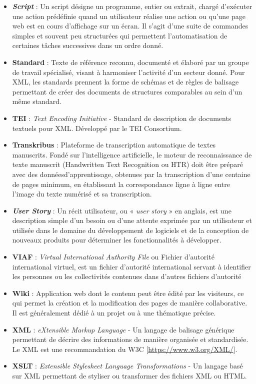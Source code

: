 \begin{itemize}
    \item \textbf{\emph{Script}} : Un script désigne un programme, entier ou extrait, chargé d'exécuter une action prédéfinie quand un utilisateur réalise une action ou qu'une page web est en cours d'affichage sur un écran. Il s'agit d'une suite de commandes simples et souvent peu structurées qui permettent l'automatisation de certaines tâches successives dans un ordre donné. 
    \item \textbf{Standard} : Texte de référence reconnu, documenté et élaboré par un groupe de travail spécialisé, visant à harmoniser l'activité d'un secteur donné. Pour XML, les standards prennent la forme de schémas et de règles de balisage permettant de créer des documents de structures comparables au sein d'un même standard.
    \item \textbf{TEI} : \emph{Text Encoding Initiative} - Standard de description de documents textuels pour XML. Développé par le TEI Consortium.
    \item{\textbf{Transkribus}} : Plateforme de transcription automatique de textes manuscrits. Fondé sur l’intelligence artificielle, le moteur de reconnaissance de texte manuscrit (Handwritten Text Recognition ou HTR) doit être préparé avec des donnéesd’apprentissage, obtenues par la transcription d’une centaine de pages minimum, en établissant la correspondance ligne à ligne entre l’image du texte numérisé et sa transcription.
    \item{\emph{\textit{\textbf{User Story}}}} : Un récit utilisateur, ou «\textit{ user story} »  en anglais, est une description simple d’un besoin ou d’une attente exprimée par un utilisateur et utilisée dans le domaine du développement de logiciels et de la conception de nouveaux produits pour déterminer les fonctionnalités à développer.
    \item \textbf{VIAF} : \emph{Virtual International Authority File} ou Fichier d'autorité international virtuel, est un fichier d'autorité international servant à identifier les personnes ou les collectivités contenues dans d'autres fichiers d'autorité
    \item \textbf{Wiki} : Application web dont le contenu peut être édité par les visiteurs, ce qui permet la création et la modification des pages de manière collaborative. Il est généralement dédié à un projet ou à une thématique précise.
    \item \textbf{XML} : \emph{eXtensible Markup Language} -  Un langage de balisage générique permettant de décrire des informations de manière organisée et standardisée. Le XML est une recommandation du W3C [\url{https://www.w3.org/XML/}].
    \item \textbf{XSLT} : \emph{Extensible Stylesheet Language Transformations} - Un langage basé sur XML permettant de styliser ou transformer des fichiers XML ou HTML.
\end{itemize}